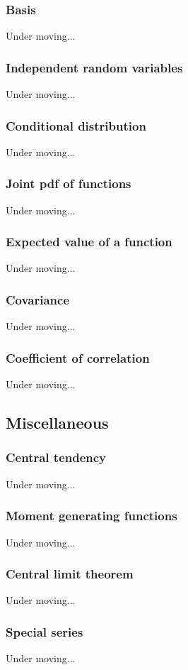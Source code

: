 \subsubsection{Basis}
Under moving...


\subsubsection{Independent random variables}
Under moving...


\subsubsection{Conditional distribution}
Under moving...


\subsubsection{Joint pdf of functions}
Under moving...


\subsubsection{Expected value of a function}
Under moving...


\subsubsection{Covariance}
Under moving...


\subsubsection{Coefficient of correlation}
Under moving...



\subsection{Miscellaneous}
\subsubsection{Central tendency}
Under moving...


\subsubsection{Moment generating functions}
Under moving...


\subsubsection{Central limit theorem}
Under moving...


\subsubsection{Special series}
Under moving...

